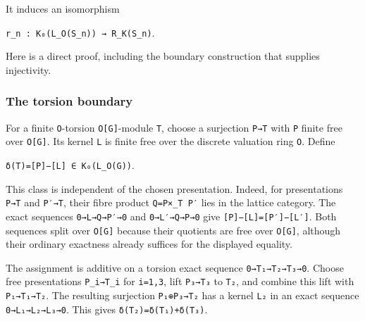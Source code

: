 \documentclass[
  10pt,
]{article}
\begin{document}
It induces an isomorphism

\texttt{\small r\_\allowbreak{}n :\allowbreak{} K₀(\allowbreak{}L\_\allowbreak{}O(\allowbreak{}S\_\allowbreak{}n)\allowbreak{})\allowbreak{} →\allowbreak{} R\_\allowbreak{}K(\allowbreak{}S\_\allowbreak{}n)\allowbreak{}}.

Here is a direct proof, including the boundary construction that
supplies injectivity.

\subsubsection{The torsion boundary}\label{the-torsion-boundary}

For a finite \texttt{\small O}-torsion
\texttt{\small O[\allowbreak{}G]\allowbreak{}}-module \texttt{\small T},
choose a surjection \texttt{\small P→\allowbreak{}T} with
\texttt{\small P} finite free over
\texttt{\small O[\allowbreak{}G]\allowbreak{}}. Its kernel
\texttt{\small L} is finite free over the discrete valuation ring
\texttt{\small O}. Define

\texttt{\small δ(\allowbreak{}T)\allowbreak{}=\allowbreak{}[\allowbreak{}P]\allowbreak{}−[\allowbreak{}L]\allowbreak{} ∈ K₀(\allowbreak{}L\_\allowbreak{}O(\allowbreak{}G)\allowbreak{})\allowbreak{}}.

This class is independent of the chosen presentation. Indeed, for
presentations \texttt{\small P→\allowbreak{}T} and
\texttt{\small P′→\allowbreak{}T}, their fibre product
\texttt{\small Q=\allowbreak{}P×\_\allowbreak{}T P′} lies in the lattice
category. The exact sequences
\texttt{\small 0→\allowbreak{}L→\allowbreak{}Q→\allowbreak{}P′→\allowbreak{}0}
and
\texttt{\small 0→\allowbreak{}L′→\allowbreak{}Q→\allowbreak{}P→\allowbreak{}0}
give
\texttt{\small [\allowbreak{}P]\allowbreak{}−[\allowbreak{}L]\allowbreak{}=\allowbreak{}[\allowbreak{}P′]\allowbreak{}−[\allowbreak{}L′]\allowbreak{}}.
Both sequences split over \texttt{\small O[\allowbreak{}G]\allowbreak{}}
because their quotients are free over
\texttt{\small O[\allowbreak{}G]\allowbreak{}}, although their ordinary
exactness already suffices for the displayed equality.

The assignment is additive on a torsion exact sequence
\texttt{\small 0→\allowbreak{}T₁→\allowbreak{}T₂→\allowbreak{}T₃→\allowbreak{}0}.
Choose free presentations
\texttt{\small P\_\allowbreak{}i→\allowbreak{}T\_\allowbreak{}i} for
\texttt{\small i=\allowbreak{}1,\allowbreak{}3}, lift
\texttt{\small P₃→\allowbreak{}T₃} to \texttt{\small T₂}, and combine
this lift with \texttt{\small P₁→\allowbreak{}T₁→\allowbreak{}T₂}. The
resulting surjection \texttt{\small P₁⊕\allowbreak{}P₃→\allowbreak{}T₂}
has a kernel \texttt{\small L₂} in an exact sequence
\texttt{\small 0→\allowbreak{}L₁→\allowbreak{}L₂→\allowbreak{}L₃→\allowbreak{}0}.
This gives
\texttt{\small δ(\allowbreak{}T₂)\allowbreak{}=\allowbreak{}δ(\allowbreak{}T₁)\allowbreak{}+\allowbreak{}δ(\allowbreak{}T₃)\allowbreak{}}.
\end{document}
